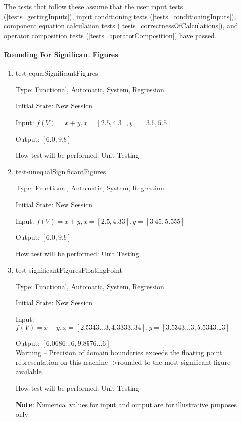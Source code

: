 \documentclass[12pt, titlepage]{article}
\begin{document}
The tests that follow these assume that the user input tests 
(\ref{tests_gettingInputs}), input conditioning tests 
(\ref{tests_conditioningInputs}), component equation calculation tests 
(\ref{tests_correctnessOfCalculations}), and operator composition tests 
(\ref{tests_operatorComposition}) have passed.

\paragraph{Rounding For Significant Figures}

\begin{enumerate}
	
	\item{test-equalSignificantFigures}
	
	Type: Functional, Automatic, System, Regression
	
	Initial State: New Session
	
	Input: $f(V) = x + y, x = [2.5,4.3], y = [3.5,5.5]$
	
	Output: $[6.0,9.8]$
	
	How test will be performed: Unit Testing\\
	
	\item{test-unequalSignificantFigures}
	
	Type: Functional, Automatic, System, Regression
	
	Initial State: New Session
	
	Input: $f(V) = x + y, x = [2.5,4.33], y = [3.45,5.555]$
	
	Output: $[6.0,9.9]$
	
	How test will be performed: Unit Testing\\
	
	\item{test-significantFiguresFloatingPoint}
	
	Type: Functional, Automatic, System, Regression
	
	Initial State: New Session
	
	Input: $f(V) = x + y, x = [2.5343...3,4.3333..34], y = 
	[3.5343...3,5.5343...3]$
	
	Output: $[6.0686...6,9.8676...6]$\\
	Warning -- Precision of domain boundaries exceeds the floating 
	point representation on this machine -\textgreater rounded to the most 
	significant figure available
	
	How test will be performed: Unit Testing
	
	\textbf{Note}: Numerical values for input and output are for illustrative 
	purposes only\\
	
\end{enumerate}
\end{document}
